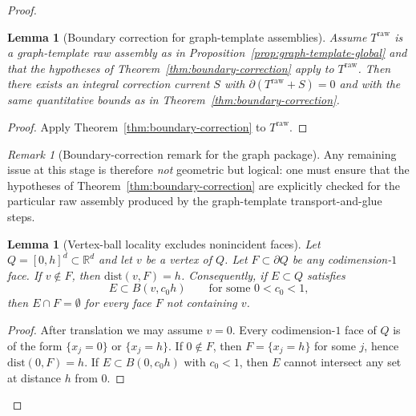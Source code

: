 \documentclass[11pt]{article}
\numberwithin{equation}{section}  %
\theoremstyle{plain}
\newtheorem{lemma}[theorem]{Lemma}
\theoremstyle{definition}
\theoremstyle{remark}
\newtheorem{remark}[theorem]{Remark}
\newcommand{\R}{\mathbb{R}}
\newcommand{\dist}{\mathrm{dist}}
\begin{document}
\begin{proof}
%
\begin{lemma}[Boundary correction for graph-template assemblies]\label{lem:graph-boundary-correction}
Assume $T^{\mathrm{raw}}$ is a graph-template raw assembly as in Proposition~\ref{prop:graph-template-global} and that the hypotheses of
Theorem~\ref{thm:boundary-correction} apply to $T^{\mathrm{raw}}$. Then there exists an integral correction current $S$ with
$\partial (T^{\mathrm{raw}}+S)=0$ and with the same quantitative bounds as in Theorem~\ref{thm:boundary-correction}.
\end{lemma}

\begin{proof}
Apply Theorem~\ref{thm:boundary-correction} to $T^{\mathrm{raw}}$.
\end{proof}

%
\begin{remark}[Boundary-correction remark for the graph package]\label{rem:graph-boundary-remark}
Any remaining issue at this stage is therefore \emph{not} geometric but logical: one must ensure that the hypotheses of
Theorem~\ref{thm:boundary-correction} are explicitly checked for the particular raw assembly produced by the graph-template transport-and-glue steps.
\end{remark}

\begin{lemma}[Vertex-ball locality excludes nonincident faces]\label{lem:ball-excludes-faces}
Let $Q=[0,h]^d\subset\R^d$ and let $v$ be a vertex of $Q$.
Let $F\subset\partial Q$ be any codimension-$1$ face. If $v\notin F$, then $\dist(v,F)=h$.
Consequently, if $E\subset Q$ satisfies
\[
E\subset B(v,c_0h)\qquad\text{for some }0<c_0<1,
\]
then $E\cap F=\emptyset$ for every face $F$ not containing $v$.
\end{lemma}
\begin{proof}
After translation we may assume $v=0$.
Every codimension-$1$ face of $Q$ is of the form $\{x_j=0\}$ or $\{x_j=h\}$.
If $0\notin F$, then $F=\{x_j=h\}$ for some $j$, hence $\dist(0,F)=h$.
If $E\subset B(0,c_0h)$ with $c_0<1$, then $E$ cannot intersect any set at distance $h$ from $0$.
\end{proof}


\end{proof}
\end{document}
